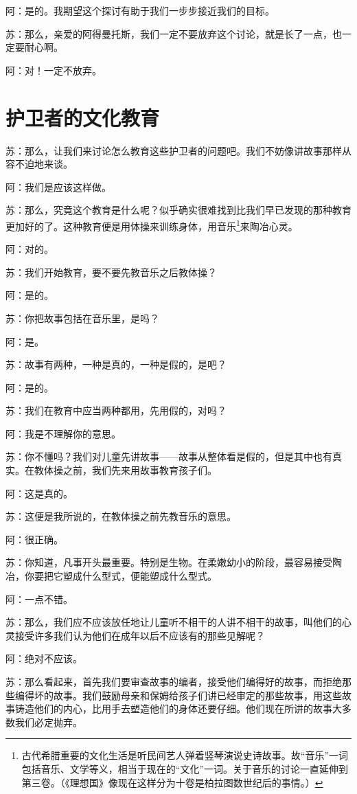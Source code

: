 \documentclass[11pt,oneside]{book}
\begin{document}
\begin{common-format}
阿：是的。我期望这个探讨有助于我们一步步接近我们的目标。

苏：那么，亲爱的阿得曼托斯，我们一定不要放弃这个讨论，就是长了一点，也一定要耐心啊。

阿：对！一定不放弃。


\section{护卫者的文化教育}
苏：那么，让我们来讨论怎么教育这些护卫者的问题吧。我们不妨像讲故事那样从容不迫地来谈。

阿：我们是应该这样做。

苏：那么，究竟这个教育是什么呢？似乎确实很难找到比我们早已发现的那种教育更加好的了。这种教育便是用体操来训练身体，用音乐\footnote{古代希腊重要的文化生活是听民间艺人弹着竖琴演说史诗故事。故“音乐”一词包括音乐、文学等义，相当于现在的“文化”一词。关于音乐的讨论一直延伸到第三卷。（《理想国》像现在这样分为十卷是柏拉图数世纪后的事情。）}来陶冶心灵。

阿：对的。

苏：我们开始教育，要不要先教音乐之后教体操？

阿：是的。

苏：你把故事包括在音乐里，是吗？

阿：是。

苏：故事有两种，一种是真的，一种是假的，是吧？

阿：是的。

苏：我们在教育中应当两种都用，先用假的，对吗？

阿：我是不理解你的意思。

苏：你不懂吗？我们对儿童先讲故事——故事从整体看是假的，但是其中也有真实。在教体操之前，我们先来用故事教育孩子们。

阿：这是真的。

苏：这便是我所说的，在教体操之前先教音乐的意思。

阿：很正确。

苏：你知道，凡事开头最重要。特别是生物。在柔嫩幼小的阶段，最容易接受陶冶，你要把它塑成什么型式，便能塑成什么型式。

阿：一点不错。

苏：那么，我们应不应该放任地让儿童听不相干的人讲不相干的故事，叫他们的心灵接受许多我们认为他们在成年以后不应该有的那些见解呢？

阿：绝对不应该。

苏：那么看起来，首先我们要审查故事的编者，接受他们编得好的故事，而拒绝那些编得坏的故事。我们鼓励母亲和保姆给孩子们讲已经审定的那些故事，用这些故事铸造他们的内心，比用手去塑造他们的身体还要仔细。他们现在所讲的故事大多数我们必定抛弃。


\end{common-format}
\end{document}
